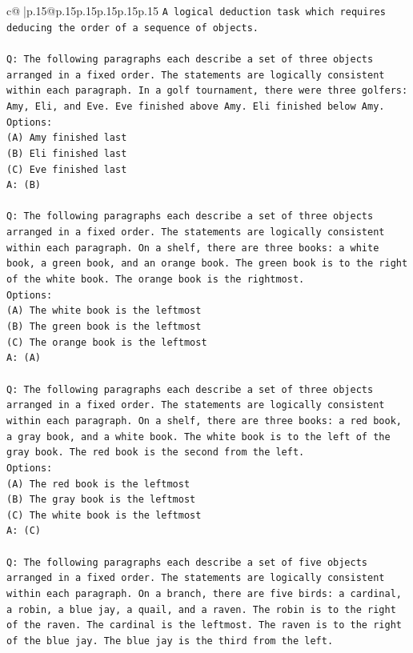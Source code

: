 \documentclass{article}
\begin{document}
{\begin{supertabular}{c@{$\;$}|p{.15\linewidth}@{}p{.15\linewidth}p{.15\linewidth}p{.15\linewidth}p{.15\linewidth}p{.15\linewidth}}
{{{\texttt{A logical deduction task which requires deducing the order of a sequence of objects.} \\
\\ 
\texttt{Q: The following paragraphs each describe a set of three objects arranged in a fixed order. The statements are logically consistent within each paragraph. In a golf tournament, there were three golfers: Amy, Eli, and Eve. Eve finished above Amy. Eli finished below Amy.} \\
\texttt{Options:} \\
\texttt{(A) Amy finished last} \\
\texttt{(B) Eli finished last} \\
\texttt{(C) Eve finished last} \\
\texttt{A: (B)} \\
\\ 
\texttt{Q: The following paragraphs each describe a set of three objects arranged in a fixed order. The statements are logically consistent within each paragraph. On a shelf, there are three books: a white book, a green book, and an orange book. The green book is to the right of the white book. The orange book is the rightmost.} \\
\texttt{Options:} \\
\texttt{(A) The white book is the leftmost} \\
\texttt{(B) The green book is the leftmost} \\
\texttt{(C) The orange book is the leftmost} \\
\texttt{A: (A)} \\
\\ 
\texttt{Q: The following paragraphs each describe a set of three objects arranged in a fixed order. The statements are logically consistent within each paragraph. On a shelf, there are three books: a red book, a gray book, and a white book. The white book is to the left of the gray book. The red book is the second from the left.} \\
\texttt{Options:} \\
\texttt{(A) The red book is the leftmost} \\
\texttt{(B) The gray book is the leftmost} \\
\texttt{(C) The white book is the leftmost} \\
\texttt{A: (C)} \\
\\ 
\texttt{Q: The following paragraphs each describe a set of five objects arranged in a fixed order. The statements are logically consistent within each paragraph. On a branch, there are five birds: a cardinal, a robin, a blue jay, a quail, and a raven. The robin is to the right of the raven. The cardinal is the leftmost. The raven is to the right of the blue jay. The blue jay is the third from the left.} \\
}}}
\end{supertabular}}
\end{document}
